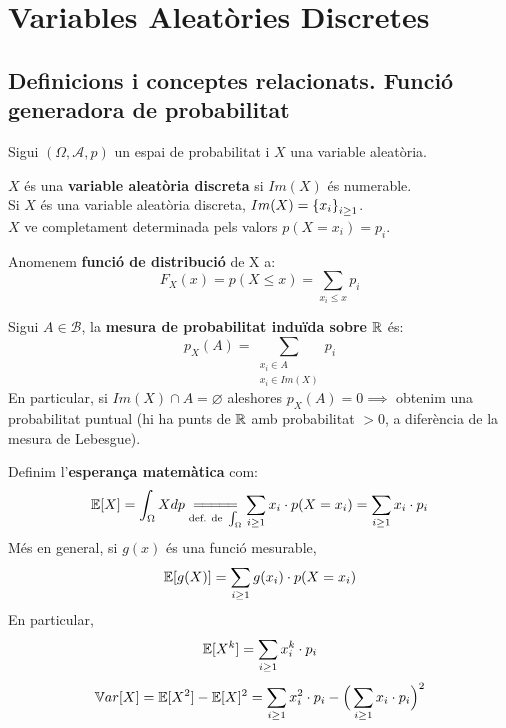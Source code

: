 \section{Variables Aleatòries Discretes}

\subsection{Definicions i conceptes relacionats. Funció generadora de probabilitat}

Sigui $(\Omega, \mathcal{A}, p)$ un espai de probabilitat i $X$ una variable aleatòria.

\begin{defi}
  $X$ és una \textbf{variable aleatòria discreta} si $Im(X)$ és numerable. \\
  Si $X$ és una variable aleatòria discreta, $Im(X) = \left\{x_{i}\right\}_{i \geq 1}$. \\ 
  $X$ ve completament determinada pels valors $p(X=x_{i}) = p_{i}$.
\end{defi}

\begin{defi}
  Anomenem \textbf{funció de distribució} de X a:
  \[
    F_{X}(x)=p(X \leq x) = \sum_{x_{i}\leq x}p_{i}
  \]
\end{defi}

\begin{defi}
  Sigui $A \in \mathcal{B}$, la \textbf{mesura de probabilitat induïda sobre} $\mathbb{R}$ és:
  \[
    p_{X}(A) = \sum_{\substack{x_{i} \in A \\ x_{i}\in Im(X)}}p_{i}
  \]
  En particular, si $Im(X)\cap A = \varnothing$ aleshores $p_{X}(A) = 0 \implies$ obtenim una probabilitat puntual (hi ha punts de $\mathbb{R}$ amb probabilitat $> 0$, a diferència de la mesura de Lebesgue).
\end{defi}

\begin{defi}
  Definim l'\textbf{esperança matemàtica} com: 
  \[
    \E [X] = \int_{\Omega}Xdp \underset{\text{def. de }\int_{\Omega}}{=\joinrel=\joinrel=\joinrel=\joinrel=} \sum_{i\geq 1}x_{i}\cdot p(X=x_{i}) = \sum_{i\geq 1}x_{i}\cdot p_{i}
  \]
  Més en general, si $g(x)$ és una funció mesurable, 
  \[
    \mathbb{E} [g(X)] = \sum_{i\geq 1}g(x_{i})\cdot p(X=x_{i})
  \]
  En particular, 
  \[
    \mathbb{E}[X^{k}]=\sum_{i\geq 1}x_{i}^{k}\cdot p_{i}
  \]
  \[
    \mathbb{V} ar[X] = \mathbb{E}[X^{2}]-\mathbb{E}[X]^{2}=\sum_{i\geq 1}x_{i}^{2}\cdot p_{i} - \Big(\sum_{i\geq 1}x_{i}\cdot p_{i} \Big)^{2}
  \]
\end{defi}


